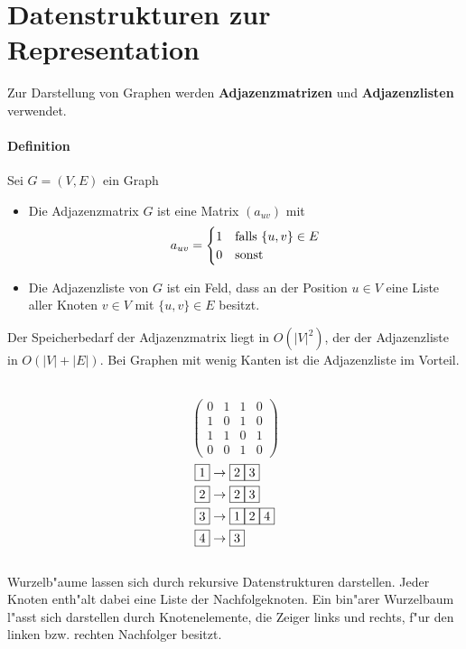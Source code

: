 \newpage
\section{Datenstrukturen zur Representation}

Zur Darstellung von Graphen werden \textbf{Adjazenzmatrizen} und \textbf{Adjazenzlisten} verwendet.

\paragraph{Definition} Sei $G=(V,E)$ ein Graph
\begin{itemize}
    \item Die Adjazenzmatrix $G$ ist eine Matrix $(a_{uv})$ mit
          \[
            a_{uv}=\begin{cases}
                1 & \text{falls } \{u,v\}\in E\\
                0 & \text{sonst}
            \end{cases}
          \]
    \item Die Adjazenzliste von $G$ ist ein Feld, dass an der Position $u\in V$ eine Liste aller Knoten
          $v\in V$ mit $\{u,v\}\in E$ besitzt.
\end{itemize}
Der Speicherbedarf der Adjazenzmatrix liegt in $O(|V|^2)$, der der Adjazenzliste in $O(|V|+|E|)$. Bei
Graphen mit wenig Kanten ist die Adjazenzliste im Vorteil.\parskp
\\
\\
\[
    \begin{pmatrix}
        0 & 1 & 1 & 0 \\
        1 & 0 & 1 & 0 \\
        1 & 1 & 0 & 1 \\
        0 & 0 & 1 & 0
    \end{pmatrix}
\]
\begin{align*}
    \fbox{1} & \rightarrow\fbox{2}\fbox{3} \\
    \fbox{2} & \rightarrow\fbox{2}\fbox{3} \\
    \fbox{3} & \rightarrow\fbox{1}\fbox{2}\fbox{4} \\
    \fbox{4} & \rightarrow\fbox{3}
\end{align*}\\
Wurzelb"aume lassen sich durch rekursive Datenstrukturen darstellen. Jeder Knoten enth"alt dabei eine Liste
der Nachfolgeknoten. Ein bin"arer Wurzelbaum l"asst sich darstellen durch Knotenelemente, die Zeiger links
und rechts, f"ur den linken bzw. rechten Nachfolger besitzt.

